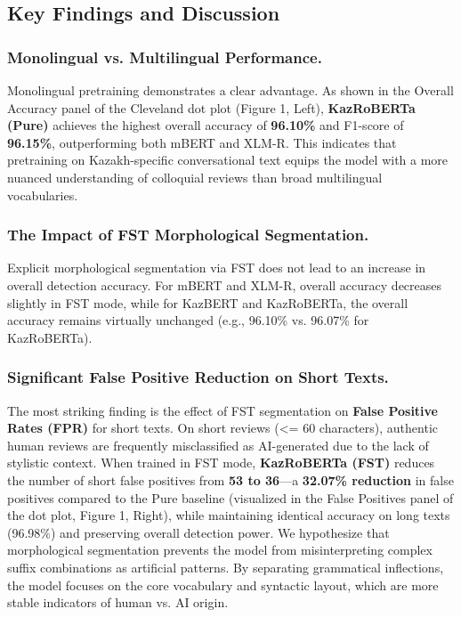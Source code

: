 \documentclass[runningheads]{llncs}
\begin{document}
\subsection{Key Findings and Discussion}
\subsubsection{Monolingual vs. Multilingual Performance.}
Monolingual pretraining demonstrates a clear advantage. As shown in the Overall Accuracy panel of the Cleveland dot plot (Figure 1, Left), \textbf{KazRoBERTa (Pure)} achieves the highest overall accuracy of \textbf{96.10\%} and F1-score of \textbf{96.15\%}, outperforming both mBERT and XLM-R. This indicates that pretraining on Kazakh-specific conversational text equips the model with a more nuanced understanding of colloquial reviews than broad multilingual vocabularies.
\subsubsection{The Impact of FST Morphological Segmentation.}
Explicit morphological segmentation via FST does not lead to an increase in overall detection accuracy. For mBERT and XLM-R, overall accuracy decreases slightly in FST mode, while for KazBERT and KazRoBERTa, the overall accuracy remains virtually unchanged (e.g., 96.10\% vs. 96.07\% for KazRoBERTa). 
\subsubsection{Significant False Positive Reduction on Short Texts.}
The most striking finding is the effect of FST segmentation on \textbf{False Positive Rates (FPR)} for short texts. On short reviews (<= 60 characters), authentic human reviews are frequently misclassified as AI-generated due to the lack of stylistic context. 
When trained in FST mode, \textbf{KazRoBERTa (FST)} reduces the number of short false positives from \textbf{53 to 36}---a \textbf{32.07\% reduction} in false positives compared to the Pure baseline (visualized in the False Positives panel of the dot plot, Figure 1, Right), while maintaining identical accuracy on long texts (96.98\%) and preserving overall detection power. 
We hypothesize that morphological segmentation prevents the model from misinterpreting complex suffix combinations as artificial patterns. By separating grammatical inflections, the model focuses on the core vocabulary and syntactic layout, which are more stable indicators of human vs. AI origin.
\end{document}
